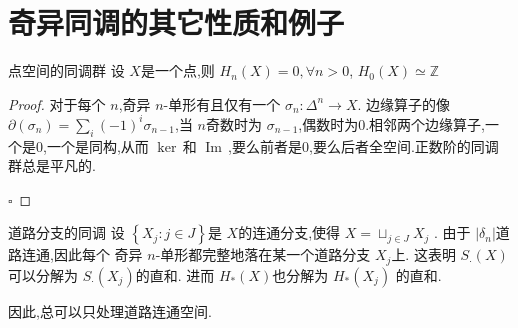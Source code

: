\documentclass[../../几何与拓扑.tex]{subfiles}
\begin{document}
\section{奇异同调的其它性质和例子}




\begin{proposition}{点空间的同调群}
    设 \(  X  \)是一个点,则 \(  H_{n}\left( X \right)= 0,\forall n> 0   \), \(  H_0\left( X \right)\simeq \mathbb{Z}    \)   
\end{proposition}
\begin{proof}
    对于每个 \(  n  \),奇异 \(  n  \)-单形有且仅有一个 \(   \sigma _{n}: \Delta ^{n}\to X  \).   边缘算子的像 \(   \partial \left(  \sigma _{n} \right)= \sum _{i}\left( -1 \right)^{i} \sigma _{n-1}    \),当 \(  n  \)奇数时为 \(   \sigma _{n-1}  \),偶数时为0.相邻两个边缘算子,一个是0,一个是同构,从而 \(    \operatorname{ker}\,\)和 \(  \operatorname{Im}\,  \),要么前者是0,要么后者全空间.正数阶的同调群总是平凡的.     

    \hfill $\square$
\end{proof}

\begin{proposition}{道路分支的同调}
    设 \(  \left\{ X_{j}: j \in J \right\}  \)是 \(  X  \)的连通分支,使得 \(  X =  \sqcup _{j \in J} X_{j}  \)   .
    由于 \(  \left|  \delta _n  \right|   \)道路连通,因此每个 奇异 \(  n  \)-单形都完整地落在某一个道路分支 \(  X_{j}  \)上.
    这表明 \(  S_{\cdot }\left( X \right)   \)可以分解为 \(  S_{\cdot }\left( X_{j} \right)   \)的直和.    
    进而 \(  H_{*}\left( X \right)   \)也分解为 \(  H_{*}\left( X_{j} \right)   \)   的直和.
\end{proposition}

\begin{remark}
    因此,总可以只处理道路连通空间.
\end{remark}
\end{document}
